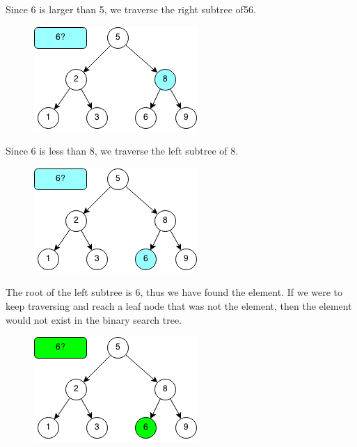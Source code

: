 \documentclass[11pt,oneside]{book}
\makeatletter
\def\maxwidth#1{\ifdim\Gin@nat@width>#1 #1\else\Gin@nat@width\fi}
\makeatother
\begin{document}
Since 6 is larger than 5, we traverse the right subtree of56.

\vspace{5px}\begin{figure}[H]\centering
        \includegraphics[width=0.66\maxwidth{\textwidth}]{bstcontains2.png}
        \end{figure}

Since 6 is less than 8, we traverse the left subtree of 8.

\vspace{5px}\begin{figure}[H]\centering
        \includegraphics[width=0.66\maxwidth{\textwidth}]{bstcontains3.png}
        \end{figure}

The root of the left subtree is 6, thus we have found the element. If we were to keep traversing and reach a leaf node that was not the element, then the element would not exist in the binary search tree.

\vspace{5px}\begin{figure}[H]\centering
        \includegraphics[width=0.66\maxwidth{\textwidth}]{bstcontains4.png}
        \end{figure}
\end{document}
